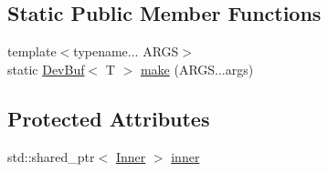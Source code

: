 \subsection*{Static Public Member Functions}
\begin{DoxyCompactItemize}
\item 
{\footnotesize template$<$typename... A\-R\-G\-S$>$ }\\static \hyperlink{classutil_1_1DevBuf}{Dev\-Buf}$<$ T $>$ \hyperlink{classutil_1_1DevBuf_a40e4485296d3d8c5d998458a5028dacb}{make} (A\-R\-G\-S...\-args)
\end{DoxyCompactItemize}
\subsection*{Protected Attributes}
\begin{DoxyCompactItemize}
\item 
std\-::shared\-\_\-ptr$<$ \hyperlink{structutil_1_1DevBuf_1_1Inner}{Inner} $>$ \hyperlink{classutil_1_1DevBuf_a66d9570dd95c6000ba401a2e4a17fcb7}{inner}
\end{DoxyCompactItemize}


